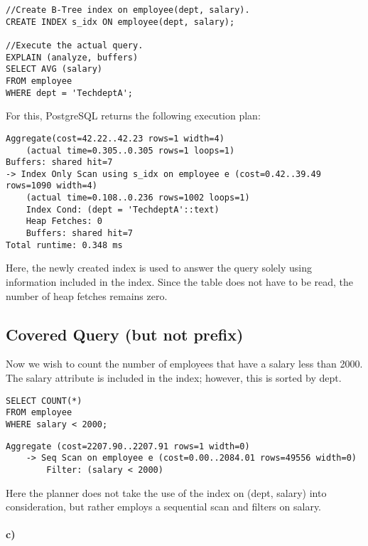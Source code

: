 \documentclass[11pt]{scrartcl}
\begin{document}
\begin{lstlisting}[style=dbtsql]
//Create B-Tree index on employee(dept, salary).
CREATE INDEX s_idx ON employee(dept, salary);

//Execute the actual query.
EXPLAIN (analyze, buffers)
SELECT AVG (salary)
FROM employee
WHERE dept = 'TechdeptA';
\end{lstlisting}

For this, PostgreSQL returns the following execution plan:

\begin{lstlisting}
Aggregate(cost=42.22..42.23 rows=1 width=4)
    (actual time=0.305..0.305 rows=1 loops=1)
Buffers: shared hit=7
-> Index Only Scan using s_idx on employee e (cost=0.42..39.49 rows=1090 width=4)
    (actual time=0.108..0.236 rows=1002 loops=1)
    Index Cond: (dept = 'TechdeptA'::text)
    Heap Fetches: 0
    Buffers: shared hit=7
Total runtime: 0.348 ms
\end{lstlisting}

Here, the newly created index is used to answer the query solely using information included in the index.  Since the table does not have to be read, the number of heap fetches remains zero.

\subsection{Covered Query (but not prefix)}

Now we wish to count the number of employees that have a salary less than 2000. The salary attribute is included in the index; however, this is sorted by dept.

\begin{lstlisting}[style=dbtsql]
SELECT COUNT(*)
FROM employee
WHERE salary < 2000;
\end{lstlisting}

\begin{lstlisting}
Aggregate (cost=2207.90..2207.91 rows=1 width=0)
    -> Seq Scan on employee e (cost=0.00..2084.01 rows=49556 width=0)
        Filter: (salary < 2000)
\end{lstlisting}

Here the planner does not take the use of the index on (dept, salary) into consideration, but rather employs a sequential scan and filters on salary.

\paragraph{c)}
\end{document}
